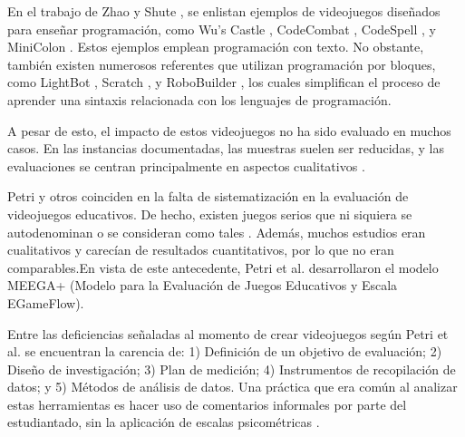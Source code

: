 En el trabajo de Zhao y Shute \cite{video_game_foster_computational_thinking}, se enlistan ejemplos de videojuegos diseñados para enseñar programación, como Wu's Castle \cite{wuscastle}, CodeCombat \cite{CodeCombat}, CodeSpell \cite{codespells}, y MiniColon \cite{minicolon}. Estos ejemplos emplean programación con texto. No obstante, también existen numerosos referentes que utilizan programación por bloques, como LightBot \cite{LightBot}, Scratch \cite{ scratch, maloney2010scratch}, y RoboBuilder \cite{RoboBuilder}, los cuales simplifican el proceso de aprender una sintaxis relacionada con los lenguajes de programación.

A pesar de esto, el impacto de estos videojuegos no ha sido evaluado en muchos casos. En las instancias documentadas, las muestras suelen ser reducidas, y las evaluaciones se centran principalmente en aspectos cualitativos \cite{video_game_foster_computational_thinking, effectiveness_gbl}.

Petri y otros \cite{meegaplus} coinciden en la falta de sistematización en la evaluación de videojuegos educativos. De hecho, existen juegos serios que ni siquiera se autodenominan o se consideran como tales \cite{evaluation_of_games_for_teaching_cs}. Además, muchos estudios eran cualitativos y carecían de resultados cuantitativos, por lo que no eran comparables.En vista de este antecedente, Petri et al. \cite{meegaplus} desarrollaron el modelo MEEGA+ (Modelo para la Evaluación de Juegos Educativos y Escala EGameFlow).

Entre las deficiencias señaladas al momento de crear videojuegos según Petri et al. \cite{meegaplus} se encuentran la carencia de: 1) Definición de un objetivo de evaluación; 2) Diseño de investigación; 3) Plan de medición; 4) Instrumentos de recopilación de datos; y 5) Métodos de análisis de datos. Una práctica que era común al analizar estas herramientas es hacer uso de comentarios informales por parte del estudiantado, sin la aplicación de escalas psicométricas \cite{meegaplus}.
